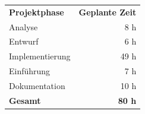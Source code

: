 \begin{tabular}{lr}
\rowcolor{heading}\textbf{Projektphase} & \textbf{Geplante Zeit} \\
Analyse & 8 h \\
\rowcolor{odd}Entwurf & 6 h \\
Implementierung & 49 h \\
\rowcolor{odd}Einführung & 7 h \\
Dokumentation & 10 h \\
\hline
\hline
\rowcolor{odd}\textbf{Gesamt} & \textbf{80 h} \\
\end{tabular}
